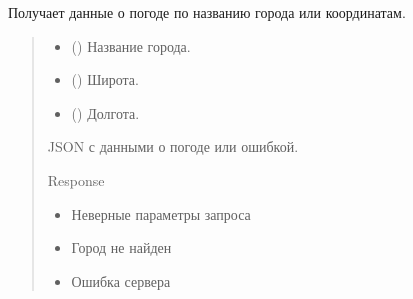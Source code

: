 \documentclass[letterpaper,10pt,russian]{sphinxmanual}
\begin{document}

\begin{fulllineitems}
\label{\detokenize{Project_weather:app.weather.controller.get_weather}}
\pysigstartsignatures
\pysiglinewithargsret
{}
{}
{}
\pysigstopsignatures
\sphinxAtStartPar
Получает данные о погоде по названию города или координатам.
\begin{quote}\begin{description}
\begin{itemize}
\item {} 
\sphinxAtStartPar
{} (\sphinxstyleliteralemphasis{\sphinxupquote{, }}) \textendash{} Название города.

\item {} 
\sphinxAtStartPar
{} (\sphinxstyleliteralemphasis{\sphinxupquote{, }}) \textendash{} Широта.

\item {} 
\sphinxAtStartPar
{} (\sphinxstyleliteralemphasis{\sphinxupquote{, }}) \textendash{} Долгота.

\end{itemize}

\sphinxAtStartPar
JSON с данными о погоде или ошибкой.

\sphinxAtStartPar
Response

\begin{itemize}
\item {} 
\sphinxAtStartPar
{} \textendash{} Неверные параметры запроса

\item {} 
\sphinxAtStartPar
{} \textendash{} Город не найден

\item {} 
\sphinxAtStartPar
{} \textendash{} Ошибка сервера

\end{itemize}

\end{description}\end{quote}

\end{fulllineitems}
\end{document}
